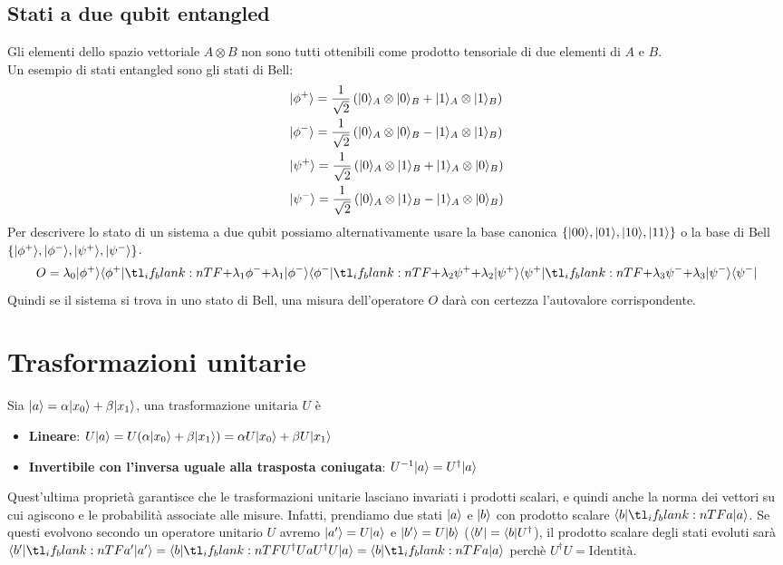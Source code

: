 \documentclass[12pt, a4paper]{report}
\begin{document}
\subsection{Stati a due qubit entangled}
Gli elementi dello spazio vettoriale $A\otimes B$ non sono tutti ottenibili come prodotto tensoriale di due elementi di $A$ e $B$. \\
Un esempio di stati entangled sono gli stati di Bell:
\begin{equation*}
    \begin{split}
        &| \phi^{+} \rangle = \frac{1}{\sqrt{2}}\left(| 0 \rangle_{A}\otimes| 0 \rangle_{B}+| 1 \rangle_{A}\otimes| 1 \rangle_{B}\right) \\
        &| \phi^{-} \rangle = \frac{1}{\sqrt{2}}\left(| 0 \rangle_{A}\otimes| 0 \rangle_{B}-| 1 \rangle_{A}\otimes| 1 \rangle_{B}\right) \\
        &| \psi^{+} \rangle = \frac{1}{\sqrt{2}}\left(| 0 \rangle_{A}\otimes| 1 \rangle_{B}+| 1 \rangle_{A}\otimes| 0 \rangle_{B}\right) \\
        &| \psi^{-} \rangle = \frac{1}{\sqrt{2}}\left(| 0 \rangle_{A}\otimes| 1 \rangle_{B}-| 1 \rangle_{A}\otimes| 0 \rangle_{B}\right) \\
    \end{split}
\end{equation*}
Per descrivere lo stato di un sistema a due qubit possiamo alternativamente usare la base canonica $\left\{| 00 \rangle,| 01 \rangle,| 10 \rangle,| 11 \rangle\right\}$ o la base di Bell $\left\{| \phi^{+} \rangle,| \phi^{-} \rangle,| \psi^{+} \rangle,| \psi^{-} \rangle\right\}$.
\begin{equation*}
    O = \lambda_{0}\ket{\phi^{+}}\braket{\phi^{+}}[+\lambda_{1}]{\phi^{-}}\braket{\phi^{-}}[+\lambda_{2}]{\psi^{+}}\braket{\psi^{+}}[+\lambda_{3}]{\psi^{-}}\bra{\psi^{-}}
\end{equation*}
Quindi se il sistema si trova in uno stato di Bell, una misura dell'operatore $O$ darà con certezza l'autovalore corrispondente.
\section{Trasformazioni unitarie}
Sia $| a \rangle = \alpha| x_{0} \rangle+\beta| x_{1} \rangle$, una trasformazione  unitaria $U$ è
\begin{itemize}
    \item \textbf{Lineare}: $U| a \rangle=U(\alpha| x_{0} \rangle+\beta| x_{1} \rangle) = \alpha U| x_{0} \rangle+\beta U| x_{1} \rangle$
    \item \textbf{Invertibile  con l'inversa uguale alla trasposta coniugata}: $U^{-1}| a \rangle=U^{\dagger}| a \rangle$
\end{itemize}
Quest'ultima proprietà garantisce che le trasformazioni unitarie lasciano invariati i prodotti scalari, e quindi anche la norma dei vettori su cui agiscono e le probabilità associate alle misure. Infatti, prendiamo due stati $| a \rangle$ e $| b \rangle$ con prodotto scalare $\braket{b}{a}$. Se questi evolvono secondo un operatore unitario $U$ avremo $| a' \rangle=U| a \rangle$ e $| b' \rangle=U| b \rangle$ ($\langle b' |=\langle b |U^{\dagger}$), il prodotto scalare degli stati evoluti sarà $\braket{b'}{a'}=\braket{b}[U^{\dagger}U]{a}=\braket{b}{a}$ perchè $U^{\dagger}U=\text{Identità}$.
\end{document}
